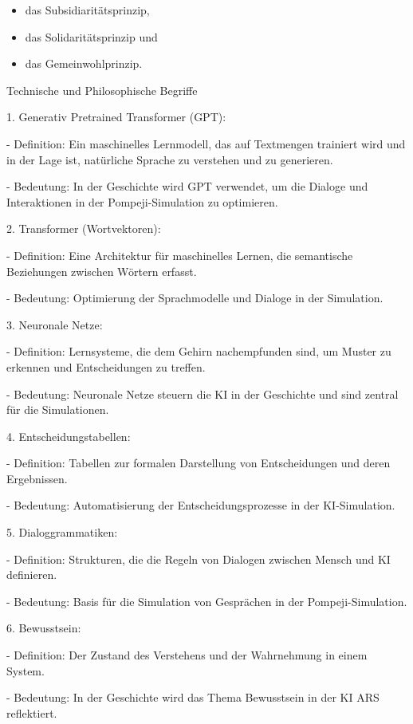 \documentclass[
]{article}
\begin{document}
\begin{itemize}
\item
  das Subsidiaritätsprinzip,
\end{itemize}

\begin{itemize}
\item
  das Solidaritätsprinzip und
\item
  das Gemeinwohlprinzip.
\end{itemize}

Technische und Philosophische Begriffe

1. Generativ Pretrained Transformer (GPT):

- Definition: Ein maschinelles Lernmodell, das auf Textmengen trainiert
wird und in der Lage ist, natürliche Sprache zu verstehen und zu
generieren.

- Bedeutung: In der Geschichte wird GPT verwendet, um die Dialoge und
Interaktionen in der Pompeji-Simulation zu optimieren.

2. Transformer (Wortvektoren):

- Definition: Eine Architektur für maschinelles Lernen, die semantische
Beziehungen zwischen Wörtern erfasst.

- Bedeutung: Optimierung der Sprachmodelle und Dialoge in der
Simulation.

3. Neuronale Netze:

- Definition: Lernsysteme, die dem Gehirn nachempfunden sind, um Muster
zu erkennen und Entscheidungen zu treffen.

- Bedeutung: Neuronale Netze steuern die KI in der Geschichte und sind
zentral für die Simulationen.

4. Entscheidungstabellen:

- Definition: Tabellen zur formalen Darstellung von Entscheidungen und
deren Ergebnissen.

- Bedeutung: Automatisierung der Entscheidungsprozesse in der
KI-Simulation.

5. Dialoggrammatiken:

- Definition: Strukturen, die die Regeln von Dialogen zwischen Mensch
und KI definieren.

- Bedeutung: Basis für die Simulation von Gesprächen in der
Pompeji-Simulation.

6. Bewusstsein:

- Definition: Der Zustand des Verstehens und der Wahrnehmung in einem
System.

- Bedeutung: In der Geschichte wird das Thema Bewusstsein in der KI ARS
reflektiert.
\end{document}
